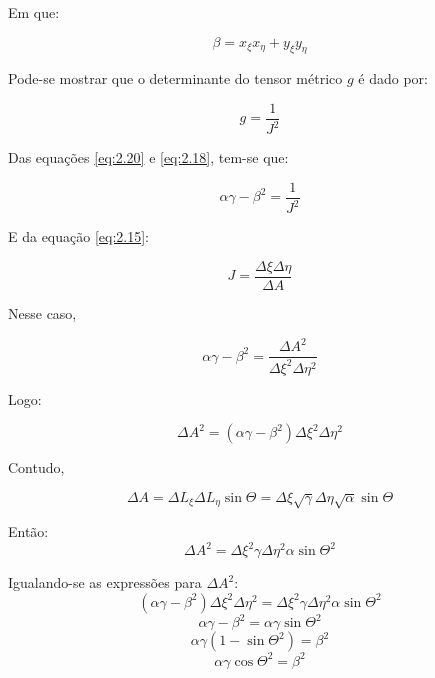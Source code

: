 Em que:

\begin{equation}
    \label{eq:2.19}
    \beta = x_\xi x_\eta + y_\xi y_\eta
\end{equation}

Pode-se mostrar que o determinante do tensor métrico $g$ é dado por:

\begin{equation}
    \label{eq:2.20}
    g = \frac{1}{J^2}
\end{equation}

Das equações \ref{eq:2.20} e \ref{eq:2.18}, tem-se que:

\begin{equation*}
    \alpha \gamma - \beta^2 = \frac{1}{J^2}
\end{equation*}

E da equação \ref{eq:2.15}:

\begin{equation*}
    J=\frac{\Delta \xi \Delta \eta}{\Delta A}
\end{equation*}


Nesse caso,

\begin{equation*}
    \alpha \gamma - \beta^2 = \frac{\Delta A^2}{\Delta \xi^2 \Delta \eta^2}
\end{equation*}

Logo:

\begin{equation*}
    \Delta A^2 = (\alpha \gamma - \beta^2)\Delta \xi^2 \Delta \eta^2
\end{equation*}

Contudo,

\begin{equation*}
    \Delta A = \Delta L_\xi \Delta L_\eta \sin{\Theta} = \Delta \xi \sqrt{\gamma} \Delta \eta \sqrt{\alpha} \sin{\Theta}
\end{equation*}

Então:
\begin{equation*}
    \Delta A^2 = \Delta \xi^2 \gamma \Delta \eta^2 \alpha \sin{\Theta}^2
\end{equation*}

Igualando-se as expressões para $\Delta A^2$:
\begin{equation*}
    (\alpha \gamma - \beta^2)\Delta\xi^2 \Delta \eta^2 = \Delta \xi^2 \gamma \Delta \eta^2 \alpha \sin{\Theta}^2
\end{equation*}
\begin{equation*}
    \alpha \gamma - \beta^2 = \alpha \gamma \sin{\Theta}^2
\end{equation*}
\begin{equation*}
    \alpha \gamma(1-\sin{\Theta}^2) = \beta^2
\end{equation*}
\begin{equation*}
    \alpha \gamma \cos{\Theta}^2 = \beta^2
\end{equation*}

